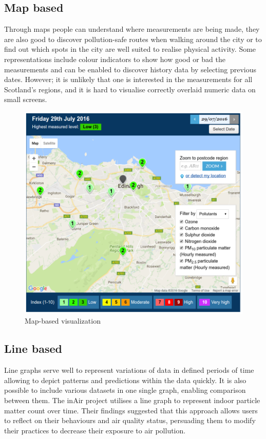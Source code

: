 \subsection{Map based}
Through maps people can understand where measurements are being made, they are also good to discover pollution-safe routes when walking around the city or to find out which spots in the city are well suited to realise physical activity.  Some representations include colour indicators to show how good or bad the measurements and can be enabled to discover history data by selecting previous dates. However; it is unlikely that one is interested in the measurements for all Scotland's regions, and it is hard to visualise correctly overlaid numeric data on small screens.

\begin{figure}[H]
\begin{adjustbox}{width=1\textwidth,center=\textwidth}
  \centering
  \includegraphics[scale=.30]{images/map_visualization.png}
\end{adjustbox}
  \caption[Map-based visualization]{Map-based visualization \cite{Scottishairquality.co.uk2016}}
  \label{fig:web_based_desktop_visualization}
\end{figure}


\subsection{Line based}
Line graphs serve well to represent variations of data in defined periods of time allowing to depict patterns and predictions within the data quickly. It is also possible to include various datasets in one single graph, enabling comparison between them. The inAir project \cite{Kim2013} utilises a line graph to represent indoor particle matter count over time. Their findings suggested that this approach allows users to reflect on their behaviours and air quality status, persuading them to modify their practices to decrease their exposure to air pollution. 

